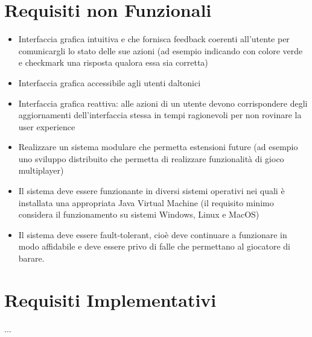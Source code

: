 	\section{Requisiti non Funzionali}
        \begin{itemize}
            \item Interfaccia grafica intuitiva e che fornisca feedback coerenti all'utente per comunicargli lo stato delle sue azioni (ad esempio indicando con colore verde e checkmark una risposta qualora essa sia corretta)
            \item Interfaccia grafica accessibile agli utenti daltonici
            \item Interfaccia grafica reattiva: alle azioni di un utente devono corrispondere degli aggiornamenti dell'interfaccia stessa in tempi ragionevoli per non rovinare la user experience
            \item Realizzare un sistema modulare che permetta estensioni future (ad esempio uno sviluppo distribuito che permetta di realizzare funzionalità di gioco multiplayer)
            \item Il sistema deve essere funzionante in diversi sistemi operativi nei quali è installata una appropriata Java Virtual Machine (il requisito minimo considera il funzionamento su sistemi Windows, Linux e MacOS)
            \item Il sistema deve essere fault-tolerant, cioè deve continuare a funzionare in modo affidabile e deve essere privo di falle che permettano al giocatore di barare.
        
        \end{itemize}

	\section{Requisiti Implementativi}
	...
	